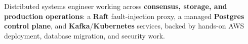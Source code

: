 Distributed systems engineer working across \textbf{consensus, storage, and production operations}: a \textbf{Raft} fault-injection proxy, a managed \textbf{Postgres control plane}, and \textbf{Kafka}/\textbf{Kubernetes} services, backed by hands-on AWS deployment, database migration, and security work.
